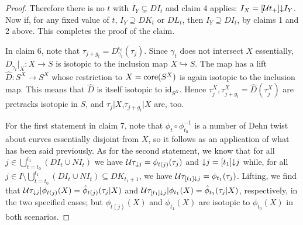 \begin{proof}
Therefore there is no $t$ with $I_Y\subsetneq DI_t$ and claim 4 applies: $I_X=[{\mathcal U} t_+]\mathord{\downarrow} I_Y$. Now if, for any fixed value of $t$, $I_Y\supseteq DK_t$ or $DL_t$, then $I_Y\supseteq DI_t$, by claims 1 and 2 above. This completes the proof of the claim.

In claim 6, note that $\tau_{j+g_t}=D_{\gamma_t}^{\epsilon_t}(\tau_j)$. Since $\gamma_t$ does not intersect $X$ essentially, $D_{\gamma_t}|_X:X\rightarrow S$ is isotopic to the inclusion map $X\hookrightarrow S$. The map has a lift $\hat D: S^X\rightarrow S^X$ whose restriction to $X=\mathrm{core}(S^X)$ is again isotopic to the inclusion map. This means that $\hat D$ is itself isotopic to $\mathrm{id}_{S^X}$. Hence $\tau_j^X,\tau_{j+g_t}^X=\hat D(\tau_j^X)$ are pretracks isotopic in $S$, and $\tau_j|X$,$\tau_{j+g_t}|X$ are, too.

For the first statement in claim 7, note that $\phi_t\circ \phi_{t_0}^{-1}$ is a number of Dehn twist about curves essentially disjoint from $X$, so it follows as an application of what has been said previously. As for the second statement, we know that for all $j\in \bigcup_{t=t_0}^{t_1} (DI_t\cup NI_t)$ we have ${\mathcal U}\tau_{\mathord{\downarrow} j}=\phi_{t(j)}(\tau_j)$ and $\mathord{\downarrow} j=[t_1]\mathord{\downarrow} j$ while, for all $j\in I\setminus \bigcup_{t=t_0}^{t_1} (DI_t\cup NI_t)\subseteq DK_{t_1+1}$, we have ${\mathcal U}\tau_{[t_1]\mathord{\downarrow} j}=\phi_{t_1}(\tau_j)$. Lifting, we find that ${\mathcal U}\tau_{\mathord{\downarrow} j}|\phi_{t(j)}(X)=\hat\phi_{t(j)}(\tau_j|X)$ and ${\mathcal U}\tau_{[t_1]\mathord{\downarrow} j}|\phi_{t_1}(X)=\hat\phi_{t_1}(\tau_j|X)$, respectively, in the two specified cases; but $\phi_{t(j)}(X)$ and $\phi_{t_1}(X)$ are isotopic to $\phi_{t_0}(X)$ in both scenarios.
\end{proof}

